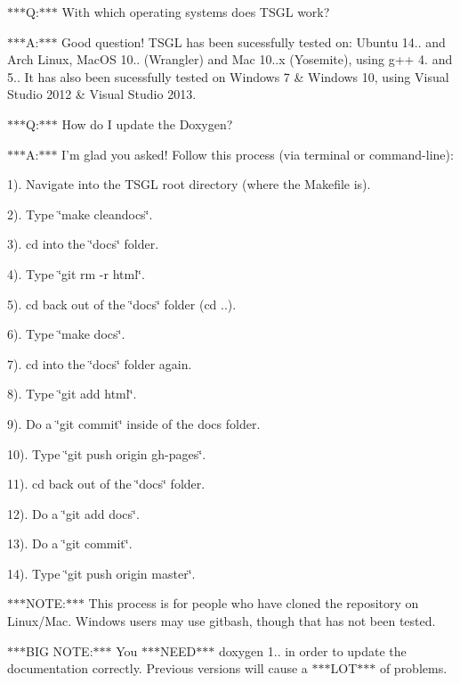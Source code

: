 $\ast$$\ast$$\ast$\-Q\-:$\ast$$\ast$$\ast$ With which operating systems does T\-S\-G\-L work?

$\ast$$\ast$$\ast$\-A\-:$\ast$$\ast$$\ast$ Good question! T\-S\-G\-L has been sucessfully tested on\-: Ubuntu 14.. and Arch Linux, Mac\-O\-S 10.. (Wrangler) and Mac 10..\-x (Yosemite), using g++ 4. and 5.. It has also been sucessfully tested on Windows 7 \& Windows 10, using Visual Studio 2012 \& Visual Studio 2013.

$\ast$$\ast$$\ast$\-Q\-:$\ast$$\ast$$\ast$ How do I update the Doxygen?

$\ast$$\ast$$\ast$\-A\-:$\ast$$\ast$$\ast$ I'm glad you asked! Follow this process (via terminal or command-\/line)\-:

1). Navigate into the T\-S\-G\-L root directory (where the Makefile is).

2). Type \char`\"{}make cleandocs\char`\"{}.

3). cd into the \char`\"{}docs\char`\"{} folder.

4). Type \char`\"{}git rm -\/r html\char`\"{}.

5). cd back out of the \char`\"{}docs\char`\"{} folder (cd ..).

6). Type \char`\"{}make docs\char`\"{}.

7). cd into the \char`\"{}docs\char`\"{} folder again.

8). Type \char`\"{}git add html\char`\"{}.

9). Do a \char`\"{}git commit\char`\"{} inside of the docs folder.

10). Type \char`\"{}git push origin gh-\/pages\char`\"{}.

11). cd back out of the \char`\"{}docs\char`\"{} folder.

12). Do a \char`\"{}git add docs\char`\"{}.

13). Do a \char`\"{}git commit\char`\"{}.

14). Type \char`\"{}git push origin master\char`\"{}.

$\ast$$\ast$$\ast$\-N\-O\-T\-E\-:$\ast$$\ast$$\ast$ This process is for people who have cloned the repository on Linux/\-Mac. Windows users may use gitbash, though that has not been tested.

$\ast$$\ast$$\ast$\-B\-I\-G N\-O\-T\-E\-:$\ast$$\ast$$\ast$ You $\ast$$\ast$$\ast$\-N\-E\-E\-D$\ast$$\ast$$\ast$ doxygen 1.. in order to update the documentation correctly. Previous versions will cause a $\ast$$\ast$$\ast$\-L\-O\-T$\ast$$\ast$$\ast$ of problems. 